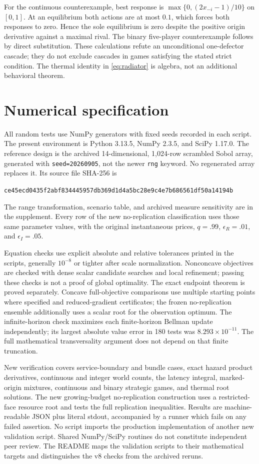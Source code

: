\documentclass[11pt,a4paper]{article}
\theoremstyle{definition}\newtheorem{definition}{Definition}
\begin{document}
For the continuous counterexample, best response is
$\max\{0,(2x_{-i}-1)/10\}$ on $[0,1]$. At an equilibrium both actions
are at most $0.1$, which forces both responses to zero. Hence the sole
equilibrium is zero despite the positive origin derivative against a
maximal rival. The binary five-player counterexample follows by direct
substitution. These calculations refute an unconditional one-defector
cascade; they do not exclude cascades in games satisfying the stated
strict condition. The thermal identity in \cref{eq:radiator} is algebra,
not an additional behavioral theorem.

\section{Numerical specification}
\label{app:numerical}
All random tests use NumPy generators with fixed seeds recorded in each
script. The present environment is Python 3.13.5, NumPy 2.3.5, and SciPy
1.17.0. The reference design is the archived 14-dimensional, 1,024-row
scrambled Sobol array, generated with \texttt{seed=20260905}, not the
newer \texttt{rng} keyword. No regenerated array replaces it. Its source
file SHA-256 is
\begin{center}\scriptsize\texttt{ce45ecd0435f2abf834445957db369d1d4a5bc28e9c4e7b686561df50a14194b}\end{center}
The range transformation, scenario table, and archived measure sensitivity
are in the supplement. Every row of the new no-replication classification
uses those same parameter values, with the original instantaneous prices,
$q=.99$, $\epsilon_R=.01$, and $\epsilon_I=.05$.

Equation checks use explicit absolute and relative tolerances printed in
the scripts, generally $10^{-8}$ or tighter after scale normalization.
Nonconcave objectives are checked with dense scalar candidate searches and
local refinement; passing these checks is not a proof of global optimality.
The exact endpoint theorem is proved separately. Concave full-objective
comparisons use multiple starting points where specified and reduced-gradient
certificates; the frozen no-replication ensemble additionally uses a scalar
root for the observation optimum. The infinite-horizon check maximizes each
finite-horizon Bellman update independently; its largest absolute value
error in 180 tests was $8.293\times10^{-11}$. The full mathematical
transversality argument does not depend on that finite truncation.

New verification covers service-boundary and bundle cases, exact hazard
product derivatives, continuous and integer world counts, the latency
integral, marked-origin mixtures, continuous and binary strategic games,
and thermal root solutions. The new growing-budget no-replication
construction uses a restricted-face resource root and tests the full
replication inequalities. Results are machine-readable JSON plus literal
stdout, accompanied by a runner which fails on any failed assertion.
No script imports the production implementation of another new validation
script. Shared NumPy/SciPy routines do not constitute independent peer review.
The README maps the validation scripts to their mathematical targets and
distinguishes the v8 checks from the archived reruns.
\end{document}
